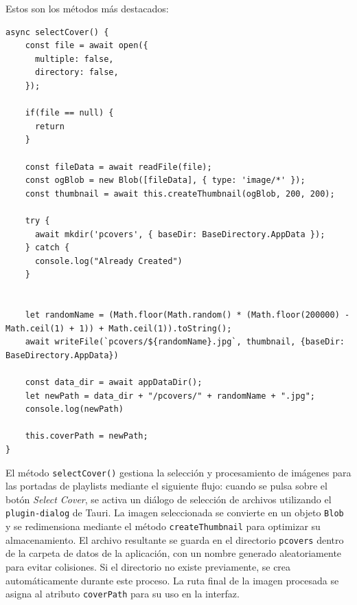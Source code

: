 \documentclass[11pt, a4paper]{article}
\begin{document}
                Estos son los métodos más destacados:

                \begin{lstlisting}[caption={selectCover()}]
async selectCover() {
    const file = await open({
      multiple: false,
      directory: false,
    });

    if(file == null) {
      return
    }

    const fileData = await readFile(file);
    const ogBlob = new Blob([fileData], { type: 'image/*' });
    const thumbnail = await this.createThumbnail(ogBlob, 200, 200);

    try {
      await mkdir('pcovers', { baseDir: BaseDirectory.AppData });
    } catch {
      console.log("Already Created")
    }
    

    let randomName = (Math.floor(Math.random() * (Math.floor(200000) - Math.ceil(1) + 1)) + Math.ceil(1)).toString();
    await writeFile(`pcovers/${randomName}.jpg`, thumbnail, {baseDir: BaseDirectory.AppData})

    const data_dir = await appDataDir();
    let newPath = data_dir + "/pcovers/" + randomName + ".jpg";
    console.log(newPath)

    this.coverPath = newPath;
}
                \end{lstlisting}

                
                El método \texttt{selectCover()} gestiona la selección y procesamiento de imágenes para las portadas de playlists mediante el siguiente flujo: cuando se pulsa sobre el botón \textit{Select Cover}, se activa un diálogo de selección de archivos utilizando el \texttt{plugin-dialog} de Tauri. La imagen seleccionada se convierte en un objeto \texttt{Blob} y se redimensiona mediante el método \texttt{createThumbnail} para optimizar su almacenamiento. El archivo resultante se guarda en el directorio \texttt{pcovers} dentro de la carpeta de datos de la aplicación, con un nombre generado aleatoriamente para evitar colisiones. Si el directorio no existe previamente, se crea automáticamente durante este proceso. La ruta final de la imagen procesada se asigna al atributo \texttt{coverPath} para su uso en la interfaz.
\end{document}
